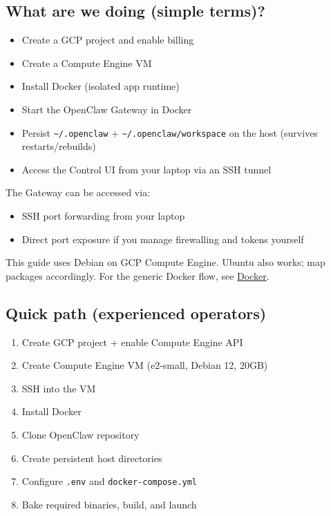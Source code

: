 \subsection{What are we doing (simple terms)?}


\begin{itemize}
  \item Create a GCP project and enable billing
  \item Create a Compute Engine VM
  \item Install Docker (isolated app runtime)
  \item Start the OpenClaw Gateway in Docker
  \item Persist \texttt{\textasciitilde{}/.openclaw} + \texttt{\textasciitilde{}/.openclaw/workspace} on the host (survives restarts/rebuilds)
  \item Access the Control UI from your laptop via an SSH tunnel
\end{itemize}


The Gateway can be accessed via:

\begin{itemize}
  \item SSH port forwarding from your laptop
  \item Direct port exposure if you manage firewalling and tokens yourself
\end{itemize}


This guide uses Debian on GCP Compute Engine.
Ubuntu also works; map packages accordingly.
For the generic Docker flow, see \href{/install/docker}{Docker}.

\hrulefill


\subsection{Quick path (experienced operators)}


\begin{enumerate}
  \item Create GCP project + enable Compute Engine API
  \item Create Compute Engine VM (e2-small, Debian 12, 20GB)
  \item SSH into the VM
  \item Install Docker
  \item Clone OpenClaw repository
  \item Create persistent host directories
  \item Configure \texttt{.env} and \texttt{docker-compose.yml}
  \item Bake required binaries, build, and launch
\end{enumerate}


